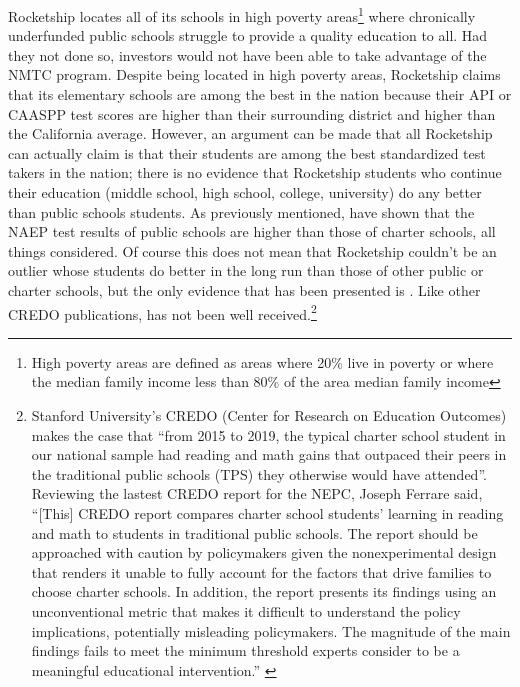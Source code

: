 Rocketship locates all of its schools in high poverty areas\footnote{High poverty areas are defined as areas where 20\% live in poverty or where the median family income less than 80\% of the area median family income\parencite[13-14]{CDFI2020}} where chronically underfunded public schools struggle to provide a quality education to all. Had they not done so, investors would not have been able to take advantage of the NMTC program. Despite being located in high poverty areas, Rocketship claims that its elementary schools are among the best in the nation \parencite{Abousalem2021} because their API or CAASPP test scores are higher than their surrounding district and higher than the California average. However, an argument can be made that all Rocketship can actually claim is that their students are among the best standardized test takers in the nation; there is no evidence that Rocketship students who continue their education (middle school, high school, college, university) do any better than public schools students. As previously mentioned, \textcite{Lubienski.Lubienski2014} have shown that the NAEP test results of public schools are higher than those of charter schools, all things considered. Of course this does not mean that Rocketship couldn't be an outlier whose students do better in the long run than those of other public or charter schools, but the only evidence that has been presented is \textcite{Raymond.etal2023}. Like other CREDO publications, \textcite{Raymond.etal2023} has not been well received.\footnote{Stanford University's CREDO (Center for Research on Education Outcomes) makes the case that ``from 2015 to 2019, the typical charter school student in our national sample had reading and math gains that outpaced their peers in the traditional public schools (TPS) they otherwise would have attended''. Reviewing the lastest CREDO report for the NEPC, Joseph Ferrare said, ``[This] CREDO report compares charter school students’ learning in reading and math to students in traditional public schools. The report should be approached with caution by policymakers given the nonexperimental design that renders it unable to fully account for the factors that drive families to choose charter schools. In addition, the report presents its findings using an unconventional metric that makes it difficult to understand the policy implications, potentially misleading policymakers. The magnitude of the main findings fails to meet the minimum threshold experts consider to be a meaningful educational intervention.'' \parencite{Ferrare2023}}

